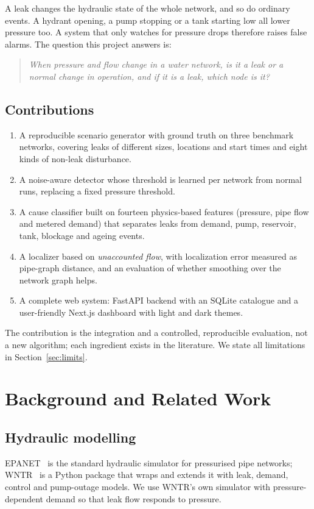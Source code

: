 \documentclass[11pt,a4paper]{article}
\begin{document}
A leak changes the hydraulic state of the whole network, and so do ordinary events. A hydrant opening, a pump stopping or a tank starting low all lower pressure too. A system that only watches for pressure drops therefore raises false alarms. The question this project answers is:

\begin{quote}\itshape When pressure and flow change in a water network, is it a leak or a normal change in operation, and if it is a leak, which node is it?\end{quote}

\subsection{Contributions}
\begin{enumerate}[itemsep=2pt]
\item A reproducible scenario generator with ground truth on three benchmark networks, covering leaks of different sizes, locations and start times and eight kinds of non-leak disturbance.
\item A noise-aware detector whose threshold is learned per network from normal runs, replacing a fixed pressure threshold.
\item A cause classifier built on fourteen physics-based features (pressure, pipe flow and metered demand) that separates leaks from demand, pump, reservoir, tank, blockage and ageing events.
\item A localizer based on \emph{unaccounted flow}, with localization error measured as pipe-graph distance, and an evaluation of whether smoothing over the network graph helps.
\item A complete web system: FastAPI backend with an SQLite catalogue and a user-friendly Next.js dashboard with light and dark themes.
\end{enumerate}
The contribution is the integration and a controlled, reproducible evaluation, not a new algorithm; each ingredient exists in the literature. We state all limitations in Section~\ref{sec:limits}.

\section{Background and Related Work}
\subsection{Hydraulic modelling}
EPANET~\cite{epanet} is the standard hydraulic simulator for pressurised pipe networks; WNTR~\cite{wntr} is a Python package that wraps and extends it with leak, demand, control and pump-outage models. We use WNTR's own simulator with pressure-dependent demand so that leak flow responds to pressure.
\end{document}
